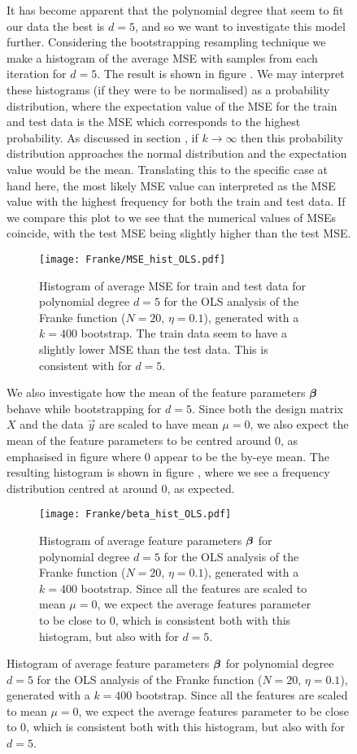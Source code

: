 \begin{figure}
            It has become apparent that the polynomial degree that seem to fit our data the best is $d=5$, and so we want to investigate this model further. Considering the bootstrapping resampling technique we make a histogram of the average MSE with samples from each iteration for $d=5$. The  result is shown  in figure . We may interpret these histograms (if they were to be normalised) as a probability distribution, where the expectation value of the MSE for the train and test data is the MSE which corresponds to the highest probability. As discussed in section , if $k\to\infty$ then this probability distribution approaches the normal distribution and the expectation value would be the mean. Translating this to the specific case at hand here, the most likely MSE value can interpreted as the MSE value with the highest frequency for both the train and test data. If we compare this plot to  we see that the numerical values of MSEs coincide, with the test MSE being slightly higher than the test MSE. 

            \begin{figure}
                \texttt{[image: Franke/MSE\_hist\_OLS.pdf]}
                \caption{Histogram of average MSE for train and test data for polynomial degree $d=5$ for the OLS analysis of the Franke function ($N=20$, $\eta=0.1$), generated with a $k=400$ bootstrap. The train data seem to have a slightly lower MSE than the test data. This is consistent with  for $d=5$.}
                \label{fig:mse_hist_ols}
            \end{figure}

            We also investigate how the mean of the feature parameters $\boldsymbol{\beta}$ behave while bootstrapping for $d=5$. Since both the design matrix $X$ and the data $\vec{y}$ are scaled to have mean $\mu=0$, we also expect the mean of the feature parameters to be centred around 0, as emphasised in figure  where 0 appear to be the by-eye mean.  The resulting histogram is shown in figure , where we see a frequency distribution centred at around 0, as expected. 

            \begin{figure}
                \texttt{[image: Franke/beta\_hist\_OLS.pdf]}
                \caption{Histogram of average feature parameters $\boldsymbol{\beta}$ for polynomial degree $d=5$ for the OLS analysis of the Franke function ($N=20$, $\eta=0.1$), generated with a $k=400$ bootstrap. Since all the features are scaled to mean $\mu=0$, we expect the average features parameter to be close to 0, which is consistent both with this histogram, but also with  for $d=5$. }
                \label{fig:beta_hist_ols}
            \end{figure}
            



\end{figure}
